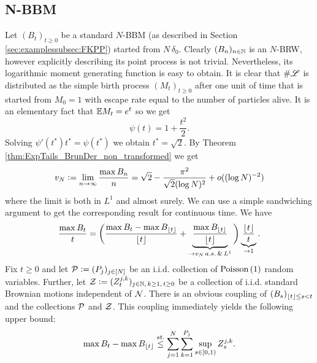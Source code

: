 \subsection{N-BBM}
Let $(B_t)_{t \geq 0}$ be a standard $N$-BBM (as described in Section \ref{sec:examplessubsec:FKPP}) started from $N\,\delta_0$. Clearly $(B_n)_{n \in \N}$ is an $N$-BRW, however explicitly describing its point process is not trivial. Nevertheless, its logarithmic moment generating function is easy to obtain. It is clear that $\# \scr{L}$ is distributed as the simple birth process $(M_t)_{t \geq 0}$ after one unit of time that is started from $M_0 = 1$ with escape rate equal to the number of particles alive. It is an elementary fact that $\E M_t = e^t$ so we get
\begin{equation}\nonumber
\psi(t) = 1 + \frac{t^2}{2}. 
\end{equation}
Solving $\psi'(t^*) t^* = \psi(t^*)$ we obtain $t^* = \sqrt{2}$. By Theorem \ref{thm:ExpTails_BrunDer_non_transformed} we get
\begin{equation}\nonumber
v_N \defeq \lim\limits_{n \to \infty} \frac{\max B_n}{n} = \sqrt{2} - \frac{\pi^2}{\sqrt{2}(\log N)^2} + o((\log N)^{-2})
\end{equation}
where the limit is both in $L^1$ and almost surely. We can use a simple sandwiching argument to get the corresponding result for continuous time. We have
\begin{equation}\label{eqn:sandwich}
\frac{\max B_t}{t} = \bigg( \frac{\max B_t - \max B_{\floor{t}}}{\floor{t}} + \underbrace{\frac{\max B_{\floor{t}}}{\floor{t}}}_{\to v_N\,a.s.\,\&\,L^1} \bigg) \underbrace{\frac{\floor{t}}{t}}_{\to 1}. 
\end{equation}
Fix $t \geq 0$ and let $\cal{P} \defeq (P_j)_{j \in [N]}$ be an i.i.d. collection of $\dPo{1}$ random variables. Further, let $\cal{Z} \defeq (Z^{j, k}_t)_{j \in \N,\,k \geq 1,\, t \geq 0}$ be a collection of i.i.d. standard Brownian motions independent of $\cal{N}$. There is an obvious coupling of $(B_s)_{\floor{t} \leq s < t}$ and the collections $\cal{P}$ and $\cal{Z}$. This coupling immediately yields the following upper bound: 
\begin{equation}
\max B_t - \max B_{\floor{t}} \stackrel{st.}{\leq} \sum\limits_{j=1}^N \sum\limits_{k=1}^{P_j} \sup\limits_{s \in [0, 1)} Z^{j, k}_s. 
\end{equation}
